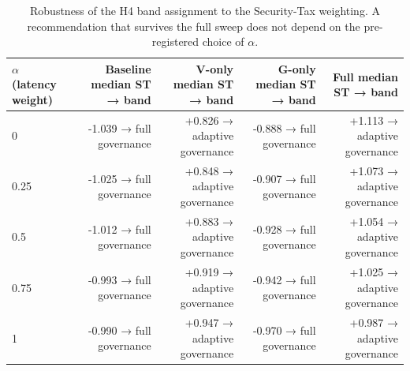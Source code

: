 \begin{table}[htbp]
\centering
\small
\caption{Robustness of the H4 band assignment to the Security-Tax weighting. A recommendation that survives the full sweep does not depend on the pre-registered choice of $\alpha$.}
\label{tab:gmais-7}
\begin{tabular}{lrrrr}
\toprule
$\alpha$ (latency weight) & Baseline median ST → band & V-only median ST → band & G-only median ST → band & Full median ST → band \\
\midrule
0 & -1.039 → full governance & +0.826 → adaptive governance & -0.888 → full governance & +1.113 → adaptive governance \\
0.25 & -1.025 → full governance & +0.848 → adaptive governance & -0.907 → full governance & +1.073 → adaptive governance \\
0.5 & -1.012 → full governance & +0.883 → adaptive governance & -0.928 → full governance & +1.054 → adaptive governance \\
0.75 & -0.993 → full governance & +0.919 → adaptive governance & -0.942 → full governance & +1.025 → adaptive governance \\
1 & -0.990 → full governance & +0.947 → adaptive governance & -0.970 → full governance & +0.987 → adaptive governance \\
\bottomrule
\end{tabular}
\end{table}
